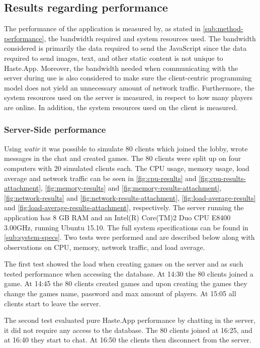 \documentclass[a4paper]{article}
\begin{document}
\subsection{Results regarding performance}
\label{sub:performance-results}
The performance of the application is measured by, as stated in \cref{sub:method-performance}, the bandwidth required and system resources used. The bandwidth considered is primarily the data required to send the JavaScript since the data required to send images, text, and other static content is not unique to Haste.App. Moreover, the bandwidth needed when communicating with the server during use is also considered to make sure the client-centric programming model does not yield an unnecessary amount of network traffic. Furthermore, the system resources used on the server is measured, in respect to how many players are online. In addition, the system resources used on the client is measured.


\subsubsection{Server-Side performance}
\label{subsub:server-performance-results}
Using \textit{watir} it was possible to simulate 80 clients which joined the lobby, wrote messages in the chat and created games. The 80 clients were split up on four computers with 20 simulated clients each. The CPU usage, memory usage, load average and network traffic can be seen in \cref{fig:cpu-results} and \cref{fig:cpu-results-attachment}, \cref{fig:memory-results} and \cref{fig:memory-results-attachment}, \cref{fig:network-results} and \cref{fig:network-results-attachment}, \cref{fig:load-average-results} and \cref{fig:load-average-results-attachment}, respectively. The server running the application has 8 GB RAM and an Intel(R) Core(TM)2 Duo CPU E8400 3.00GHz, running Ubuntu 15.10. The full system specifications can be found in \cref{sub:system-specs}. Two tests were performed and are described below along with observations on CPU, memory, network traffic, and load average.

The first test showed the load when creating games on the server and as such tested performance when accessing the database. At 14:30 the 80 clients joined a game. At 14:45 the 80 clients created games and upon creating the games they change the games name, password and max amount of players. At 15:05 all clients start to leave the server.

The second test evaluated pure Haste.App performance by chatting in the server, it did not require any access to the database. The 80 clients joined at 16:25, and at 16:40 they start to chat. At 16:50 the clients then disconnect from the server.
\end{document}
